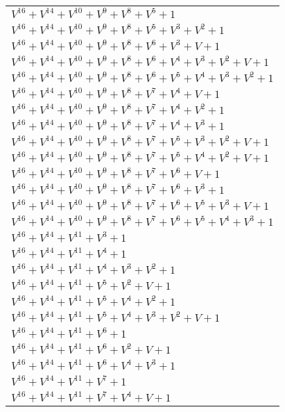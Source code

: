 \documentclass[12pt]{article}
\begin{document}
\begin{adjustwidth}{-4cm}{}
\begin{center}
\begin{longtable}{|l|}
$V^{16}  +V^{14}  +V^{10}  +V^{9}  +V^{8}  +V^{5}  + 1$ \\
$V^{16}  +V^{14}  +V^{10}  +V^{9}  +V^{8}  +V^{5}  +V^{3}  +V^{2}  + 1$ \\
$V^{16}  +V^{14}  +V^{10}  +V^{9}  +V^{8}  +V^{6}  +V^{3}  + V + 1$ \\
$V^{16}  +V^{14}  +V^{10}  +V^{9}  +V^{8}  +V^{6}  +V^{4}  +V^{3}  +V^{2}  + V + 1$ \\
$V^{16}  +V^{14}  +V^{10}  +V^{9}  +V^{8}  +V^{6}  +V^{5}  +V^{4}  +V^{3}  +V^{2}  + 1$ \\
$V^{16}  +V^{14}  +V^{10}  +V^{9}  +V^{8}  +V^{7}  +V^{4}  + V + 1$ \\
$V^{16}  +V^{14}  +V^{10}  +V^{9}  +V^{8}  +V^{7}  +V^{4}  +V^{2}  + 1$ \\
$V^{16}  +V^{14}  +V^{10}  +V^{9}  +V^{8}  +V^{7}  +V^{4}  +V^{3}  + 1$ \\
$V^{16}  +V^{14}  +V^{10}  +V^{9}  +V^{8}  +V^{7}  +V^{5}  +V^{3}  +V^{2}  + V + 1$ \\
$V^{16}  +V^{14}  +V^{10}  +V^{9}  +V^{8}  +V^{7}  +V^{5}  +V^{4}  +V^{2}  + V + 1$ \\
$V^{16}  +V^{14}  +V^{10}  +V^{9}  +V^{8}  +V^{7}  +V^{6}  + V + 1$ \\
$V^{16}  +V^{14}  +V^{10}  +V^{9}  +V^{8}  +V^{7}  +V^{6}  +V^{3}  + 1$ \\
$V^{16}  +V^{14}  +V^{10}  +V^{9}  +V^{8}  +V^{7}  +V^{6}  +V^{5}  +V^{3}  + V + 1$ \\
$V^{16}  +V^{14}  +V^{10}  +V^{9}  +V^{8}  +V^{7}  +V^{6}  +V^{5}  +V^{4}  +V^{3}  + 1$ \\
$V^{16}  +V^{14}  +V^{11}  +V^{3}  + 1$ \\
$V^{16}  +V^{14}  +V^{11}  +V^{4}  + 1$ \\
$V^{16}  +V^{14}  +V^{11}  +V^{4}  +V^{3}  +V^{2}  + 1$ \\
$V^{16}  +V^{14}  +V^{11}  +V^{5}  +V^{2}  + V + 1$ \\
$V^{16}  +V^{14}  +V^{11}  +V^{5}  +V^{4}  +V^{2}  + 1$ \\
$V^{16}  +V^{14}  +V^{11}  +V^{5}  +V^{4}  +V^{3}  +V^{2}  + V + 1$ \\
$V^{16}  +V^{14}  +V^{11}  +V^{6}  + 1$ \\
$V^{16}  +V^{14}  +V^{11}  +V^{6}  +V^{2}  + V + 1$ \\
$V^{16}  +V^{14}  +V^{11}  +V^{6}  +V^{4}  +V^{3}  + 1$ \\
$V^{16}  +V^{14}  +V^{11}  +V^{7}  + 1$ \\
$V^{16}  +V^{14}  +V^{11}  +V^{7}  +V^{4}  + V + 1$ \\

\end{longtable}
\end{center}
\end{adjustwidth}
\end{document}
